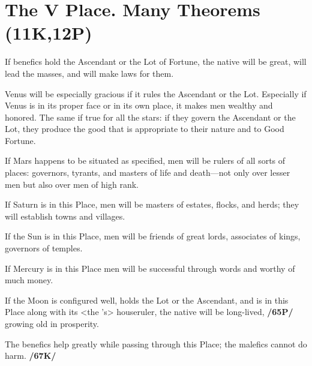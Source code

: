 \section{The V Place. Many Theorems (11K,12P)}

If benefics hold the Ascendant or the Lot of Fortune, the native will be great, will lead the masses, and will make laws for them.

Venus will be especially gracious if it rules the Ascendant or the Lot. Especially if Venus is in its proper face or in its own place, it makes men wealthy and honored. \mndl The same if true for all the stars: if they govern the Ascendant or the Lot, they produce the good that is appropriate to their nature and to Good Fortune. 

If Mars happens to be situated as specified, men will be rulers of all sorts of places: governors, tyrants, and masters of life and death—not only over lesser men but also over men of
high rank. 

If Saturn is in this Place, men will be masters of estates, flocks, and herds; they will establish towns and villages. 

If the Sun is in this Place, men will be friends of great lords, associates of kings, governors of temples. 

If Mercury is in this Place men will be successful through words and worthy of much money. 

If the Moon is configured well, holds the Lot or the Ascendant, and is in this Place along with its <the \Moon’s> houseruler, the native will be long-lived, \textbf{/65P/} growing old in prosperity. 

\mndl The benefics help greatly while passing through this Place; the malefics cannot do harm. \textbf{/67K/}

\newpage